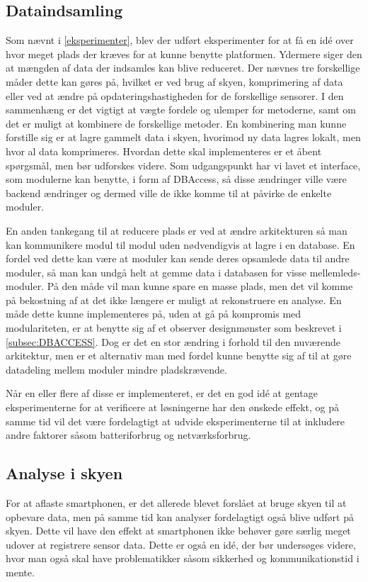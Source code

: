 \subsection{Dataindsamling}
Som nævnt i \cref{eksperimenter}, blev der udført eksperimenter for at få en idé over hvor meget plads der kræves for at kunne benytte platformen.
Ydermere siger den at mængden af data der indsamles kan blive reduceret.
Der nævnes tre forskellige måder dette kan gøres på, hvilket er ved brug af skyen, komprimering af data eller ved at ændre på opdateringshastigheden for de forskellige sensorer.
I den sammenhæng er det vigtigt at vægte fordele og ulemper for metoderne, samt om det er muligt at kombinere de forskellige metoder.
En kombinering man kunne forstille sig er at lagre gammelt data i skyen, hvorimod ny data lagres lokalt, men hvor al data komprimeres.
Hvordan dette skal implementeres er et åbent spørgsmål, men bør udforskes videre.
Som udgangspunkt har vi lavet et interface, som modulerne kan benytte, i form af DBAccess, så disse ændringer ville være backend ændringer og dermed ville de ikke komme til at påvirke de enkelte moduler.


En anden tankegang til at reducere plads er ved at ændre arkitekturen så man kan kommunikere modul til modul uden nødvendigvis at lagre i en database.
En fordel ved dette kan være at moduler kan sende deres opsamlede data til andre moduler, så man kan undgå helt at gemme data i databasen for visse mellemleds-moduler.
På den måde vil man kunne spare en masse plads, men det vil komme på bekostning af at det ikke længere er muligt at rekonstruere en analyse. En måde dette kunne implementeres på, uden at gå på kompromis med modulariteten, er at benytte sig af et observer designmønster som beskrevet i \cref{subsec:DBACCESS}.
Dog er det en stor ændring i forhold til den nuværende arkitektur, men er et alternativ man med fordel kunne benytte sig af til at gøre datadeling mellem moduler mindre pladskrævende.

Når en eller flere af disse er implementeret, er det en god idé at gentage eksperimenterne for at verificere at løsningerne har den ønskede effekt, og på samme tid vil det være fordelagtigt at udvide eksperimenterne til at inkludere andre faktorer såsom batteriforbrug og netværksforbrug.

\subsection{Analyse i skyen}
For at aflaste smartphonen, er det allerede blevet forslået at bruge skyen til at opbevare data, men på samme tid kan analyser fordelagtigt også blive udført på skyen. 
Dette vil have den effekt at smartphonen ikke behøver gøre særlig meget udover at registrere sensor data.
Dette er også en idé, der bør undersøges videre, hvor man også skal have problematikker såsom sikkerhed og kommunikationstid i mente.

